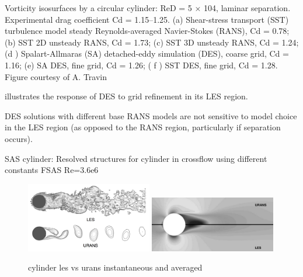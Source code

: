 \documentclass[journal]{new-aiaa}
\begin{document}
Vorticity isosurfaces by a circular cylinder: ReD = 5 × 104, laminar separation. Experimental drag
coefficient Cd = 1.15–1.25. (a) Shear-stress transport (SST) turbulence model steady Reynolds-averaged
Navier-Stokes (RANS), Cd = 0.78; (b) SST 2D unsteady RANS, Cd = 1.73; (c) SST 3D unsteady RANS,
Cd = 1.24; (d ) Spalart-Allmaras (SA) detached-eddy simulation (DES), coarse grid, Cd = 1.16; (e) SA DES,
fine grid, Cd = 1.26; ( f ) SST DES, fine grid, Cd = 1.28. Figure courtesy of A. Travin



illustrates the response of DES to grid refinement in its LES region.

DES solutions with different base RANS models are not sensitive to
model choice in the LES region (as opposed to the RANS region, particularly if separation occurs).








SAS cylinder: Resolved structures for cylinder in crossflow using different constants FSAS Re=3.6e6






\begin{figure}[H]
\begin{center}
\includegraphics[width=0.49\textwidth]{Images/logan/catalano_2003numerical_UnsteadyURANSvsLES.pdf}
\includegraphics[width=0.49\textwidth]{Images/logan/catalano_2003numerical_SteadyURANSvsLES.pdf}
\caption{ cylinder les vs urans instantaneous and averaged \cite{catalano2003numerical} }
\label{fig:cylinderransvslesflow}
\end{center}
\end{figure}
\end{document}

